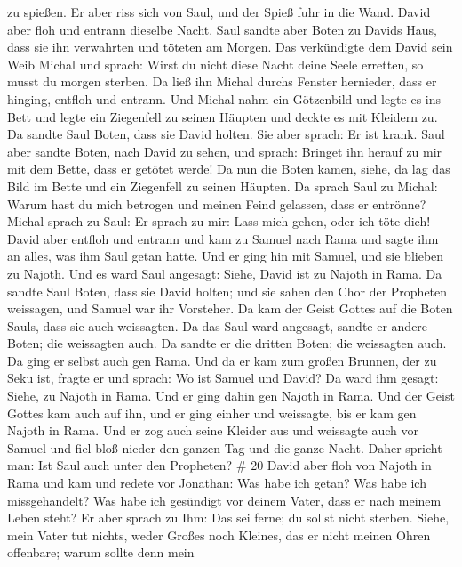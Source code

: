 zu spießen. Er aber riss sich von Saul, und der Spieß fuhr in die Wand.
David aber floh und entrann dieselbe Nacht.  Saul sandte
aber Boten zu Davids Haus, dass sie ihn verwahrten und töteten am
Morgen. Das verkündigte dem David sein Weib Michal und sprach: Wirst du
nicht diese Nacht deine Seele erretten, so musst du morgen sterben.
 Da ließ ihn Michal durchs Fenster hernieder, dass er
hinging, entfloh und entrann.  Und Michal nahm ein
Götzenbild und legte es ins Bett und legte ein Ziegenfell zu seinen
Häupten und deckte es mit Kleidern zu.  Da sandte Saul
Boten, dass sie David holten. Sie aber sprach: Er ist krank.
 Saul aber sandte Boten, nach David zu sehen, und sprach:
Bringet ihn herauf zu mir mit dem Bette, dass er getötet werde!
 Da nun die Boten kamen, siehe, da lag das Bild im Bette
und ein Ziegenfell zu seinen Häupten.  Da sprach Saul zu
Michal: Warum hast du mich betrogen und meinen Feind gelassen, dass er
entrönne? Michal sprach zu Saul: Er sprach zu mir: Lass mich gehen, oder
ich töte dich!  David aber entfloh und entrann und kam zu
Samuel nach Rama und sagte ihm an alles, was ihm Saul getan hatte. Und
er ging hin mit Samuel, und sie blieben zu Najoth.  Und es
ward Saul angesagt: Siehe, David ist zu Najoth in Rama.  Da
sandte Saul Boten, dass sie David holten; und sie sahen den Chor der
Propheten weissagen, und Samuel war ihr Vorsteher. Da kam der Geist
Gottes auf die Boten Sauls, dass sie auch weissagten.  Da
das Saul ward angesagt, sandte er andere Boten; die weissagten auch. Da
sandte er die dritten Boten; die weissagten auch.  Da ging
er selbst auch gen Rama. Und da er kam zum großen Brunnen, der zu Seku
ist, fragte er und sprach: Wo ist Samuel und David? Da ward ihm gesagt:
Siehe, zu Najoth in Rama.  Und er ging dahin gen Najoth in
Rama. Und der Geist Gottes kam auch auf ihn, und er ging einher und
weissagte, bis er kam gen Najoth in Rama.  Und er zog auch
seine Kleider aus und weissagte auch vor Samuel und fiel bloß nieder den
ganzen Tag und die ganze Nacht. Daher spricht man: Ist Saul auch unter
den Propheten? \# 20  David aber floh von Najoth in Rama und
kam und redete vor Jonathan: Was habe ich getan? Was habe ich
missgehandelt? Was habe ich gesündigt vor deinem Vater, dass er nach
meinem Leben steht?  Er aber sprach zu Ihm: Das sei ferne;
du sollst nicht sterben. Siehe, mein Vater tut nichts, weder Großes noch
Kleines, das er nicht meinen Ohren offenbare; warum sollte denn mein
